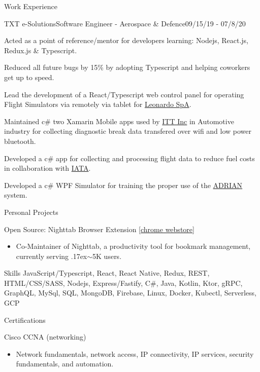 \documentclass{article}
\newlength{\tabin}
\newlength{\secsep}
\newcommand{\lineunder}{\vspace*{-8pt} \\ \hspace*{-6pt} \hrulefill \\ \vspace*{-15pt}}
\newenvironment{tabbedsection}[1]{
  \begin{list}{}{
      \setlength{\itemsep}{0pt}
      \setlength{\labelsep}{0pt}
      \setlength{\labelwidth}{0pt}
      \setlength{\leftmargin}{\tabin}
      \setlength{\rightmargin}{\tabin}
      \setlength{\listparindent}{0pt}
      \setlength{\parsep}{0pt}
      \setlength{\parskip}{0pt}
      \setlength{\partopsep}{0pt}
      \setlength{\topsep}{#1}
    }
  \item[]
}{\end{list}}
\newenvironment{resume_section}[1]{
  \filbreak
  \vspace{2\secsep}
  \textsc{\large#1}
  \lineunder
  \begin{tabbedsection}{\secsep}
}{\end{tabbedsection}}
\newenvironment{resume_subsection}[2][]{
  \textbf{#2} \hfill {\footnotesize #1} \hspace{2em}
  \begin{tabbedsection}{0.5\secsep}
}{\end{tabbedsection}}
\newenvironment{subitems}{
  \renewcommand{\labelitemi}{-}
  \begin{itemize}
      \setlength{\labelsep}{1em}
}{\end{itemize}}
\newenvironment{resume_employer}[4]{
  \vspace{\secsep}
  \textbf{#1} \\ 
  \indent {\small #2} \hfill {\footnotesize#3 (#4)}

}
\newenvironment{resume_work_bullets}{
  \begin{tabbedsection}{0pt}
  \begin{subitems}
}{\end{subitems}\end{tabbedsection}}
\begin{document}
\begin{resume_section}{Work Experience}
  \begin{resume_employer}{TXT e-Solutions}{Software Engineer - Aerospace \& Defence}{}{09/15/19 - 07/8/20}
    \begin{resume_work_bullets}
        \item Acted as a point of reference/mentor for developers learning: Nodejs, React.js, Redux.js \& Typescript.
        \item Reduced all future bugs by 15\% by adopting Typescript and helping coworkers get up to speed.
        \item Lead the development of a React/Typescript web control panel for operating Flight Simulators via remotely via tablet for \href{https://www.leonardocompany.com/en/home}{Leonardo SpA}.
        \item Maintained c\# two Xamarin Mobile apps used by \href {https://www.itt.com/home}{ITT Inc} in Automotive industry for collecting diagnostic break data transfered over wifi and low power bluetooth.
        \item Developed a c\# app for collecting and processing flight data to reduce fuel costs in collaboration with \href{http://pace.txtgroup.com/products/flight-operations/pacelab-flight-profile-optimizer/}{IATA}.
        \item Developed a c\# WPF Simulator for training the proper use of the \href{https://www.elt-roma.com/product/adrian}{ADRIAN} system.
    \end{resume_work_bullets}
  \end{resume_employer}
  
\end{resume_section}

\begin{resume_section}{Personal Projects}
    \begin{resume_subsection}{Open Source: Nighttab Browser Extension [{\href{https://chrome.google.com/webstore/detail/nighttab/hdpcadigjkbcpnlcpbcohpafiaefanki}{chrome webstore}]}}
    \begin{subitems}
    \item Co-Maintainer of Nighttab, a productivity tool for bookmark management, currently serving {\raise.17ex\hbox{$\scriptstyle\sim$}}5K users.
    \end{subitems}
  \end{resume_subsection}
\end{resume_section}

\begin{resume_section}{Skills}
  JavaScript/Typescript, React, React Native, Redux, REST, HTML/CSS/SASS, Nodejs, Express/Fastify, C\#, Java, Kotlin, Ktor, gRPC, GraphQL, MySql, SQL, MongoDB, Firebase, Linux, Docker, Kubectl, Serverless, GCP
\end{resume_section}

\begin{resume_section}{Certifications}
  \begin{resume_subsection}[]{Cisco CCNA (networking)}
    \begin{subitems}
      \item Network fundamentals, network access, IP connectivity, IP services, security fundamentals, and automation.
    \end{subitems}
  \end{resume_subsection}
\end{resume_section}
\end{document}
